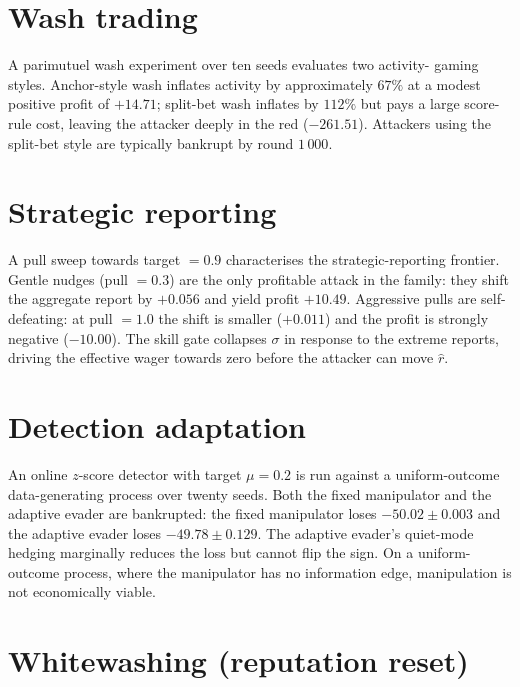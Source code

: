 \documentclass[
  11pt,
  a4paper,
  oneside]{report}
\begin{document}
\section{Wash trading}\label{wash-trading}

A parimutuel wash experiment over ten seeds evaluates two activity-
gaming styles. Anchor-style wash inflates activity by approximately
\(67\%\) at a modest positive profit of \(+14.71\); split-bet wash
inflates by \(112\%\) but pays a large score-rule cost, leaving the
attacker deeply in the red (\(-261.51\)). Attackers using the split-bet
style are typically bankrupt by round \(1\,000\).

\section{Strategic reporting}\label{strategic-reporting}

A pull sweep towards target \(= 0.9\) characterises the
strategic-reporting frontier. Gentle nudges (pull \(= 0.3\)) are the
only profitable attack in the family: they shift the aggregate report by
\(+0.056\) and yield profit \(+10.49\). Aggressive pulls are
self-defeating: at pull \(= 1.0\) the shift is smaller (\(+0.011\)) and
the profit is strongly negative (\(-10.00\)). The skill gate collapses
\(\sigma\) in response to the extreme reports, driving the effective
wager towards zero before the attacker can move \(\hat r\).

\section{Detection adaptation}\label{detection-adaptation}

An online \(z\)-score detector with target \(\mu = 0.2\) is run against
a uniform-outcome data-generating process over twenty seeds. Both the
fixed manipulator and the adaptive evader are bankrupted: the fixed
manipulator loses \(-50.02 \pm 0.003\) and the adaptive evader loses
\(-49.78 \pm 0.129\). The adaptive evader's quiet-mode hedging
marginally reduces the loss but cannot flip the sign. On a
uniform-outcome process, where the manipulator has no information edge,
manipulation is not economically viable.

\section{Whitewashing (reputation
reset)}\label{whitewashing-reputation-reset}
\end{document}
